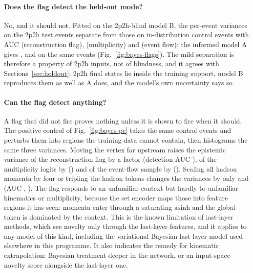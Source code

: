 \documentclass[11pt]{article}
\begin{document}
\paragraph{Does the flag detect the held-out mode?} No, and it should not. Fitted on the 2p2h-blind model B,
the per-event variances on the \nBayBnOOD{} 2p2h test events separate from those on \nBayBnCtl{} in-distribution
control events with AUC \nBayBExistAUC{} (reconstruction flag), \nBayBCardAUC{} (multiplicity) and
\nBayBFlowAUC{} (event flow); the informed model A gives \nBayAExistAUC{}, \nBayACardAUC{} and \nBayAFlowAUC{} on
the same events (Fig.~\ref{fig:bayes-flags}). The mild separation is therefore a property of 2p2h inputs, not
of blindness, and it agrees with Sections~\ref{sec:holdout}: 2p2h final states lie inside the training support,
model B reproduces them as well as A does, and the model's own uncertainty says so.

\paragraph{Can the flag detect anything?} A flag that did not fire proves nothing unless it is shown to fire when it
should. The positive control of Fig.~\ref{fig:bayes-pc} takes the same control events and perturbs them into
regions the training data cannot contain, then histograms the same three variances. Moving the vertex far upstream raises the epistemic variance
of the reconstruction flag by a factor \nPCVtxExistRatio{} (detection AUC \nPCVtxExistAUC{}), of the multiplicity
logits by \nPCVtxCardRatio{} (\nPCVtxCardAUC{}) and of the event-flow sample by \nPCVtxFlowRatio{} (\nPCVtxFlowAUC{}).
Scaling all hadron momenta by four or tripling the hadron tokens changes the variances by only
\nPCPfourExistRatio{} and \nPCTokthreeExistRatio{} (AUC \nPCPfourExistAUC{}, \nPCTokthreeExistAUC{}). The flag
responds to an unfamiliar context but hardly to unfamiliar kinematics or multiplicity, because the set encoder
maps those into feature regions it has seen: momenta enter through a saturating $\mathrm{asinh}$ and the global
token is dominated by the context. This is the known limitation of last-layer methods, which see novelty only
through the last-layer features, and it applies to any model of this kind, including the variational Bayesian
last-layer model used elsewhere in this programme. It also indicates the remedy for kinematic extrapolation:
Bayesian treatment deeper in the network, or an input-space novelty score alongside the last-layer one.
\end{document}
